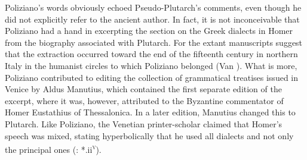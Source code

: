 Poliziano’s words obviously echoed Pseudo-Plutarch’s comments, even though he did not explicitly refer to the ancient author. In fact, it is not inconceivable that Poliziano had a hand in excerpting the section on the Greek dialects in Homer from the biography associated with Plutarch. For the extant manuscripts suggest that the extraction occurred toward the end of the fifteenth century in northern Italy in the humanist circles to which Poliziano belonged (Van \citealt{Rooy2018c}). What is more, Poliziano contributed to editing the collection of grammatical treatises issued in Venice by Aldus Manutius, which contained the first separate edition of the excerpt, where it was, however, attributed to the Byzantine commentator of Homer Eustathius of Thessalonica. In a later edition, Manutius changed this to Plutarch. Like Poliziano, the Venetian printer-scholar claimed that Homer’s speech was mixed, stating hyperbolically that he used all dialects and not only the principal ones (\citealt{Manutius1496}: *.ii\textsc{\textsuperscript{v}}).

